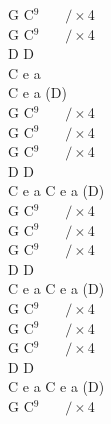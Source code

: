 \documentclass[a5paper, 10pt]{book}
\begin{document}
\begin{minipage}[t]{0.2\textwidth}
  G C$^9$ ~~~$/ \times$4\\
  G C$^9$ ~~~$/ \times$4\\
  D D\\
  C e a\\
  C e a (D)\\
  G C$^9$ ~~~$/ \times$4\\

  G C$^9$ ~~~$/ \times$4\\
  G C$^9$ ~~~$/ \times$4\\
  D D\\
  C e a
  C e a (D)\\
  G C$^9$ ~~~$/ \times$4\\

  G C$^9$ ~~~$/ \times$4\\
  G C$^9$ ~~~$/ \times$4\\
  D D\\
  C e a
  C e a (D)\\
  G C$^9$ ~~~$/ \times$4\\

  G C$^9$ ~~~$/ \times$4\\
  G C$^9$ ~~~$/ \times$4\\
  D D\\
  C e a
  C e a (D)\\
  G C$^9$ ~~~$/ \times$4\\
\end{minipage}

\newpage
\end{document}
